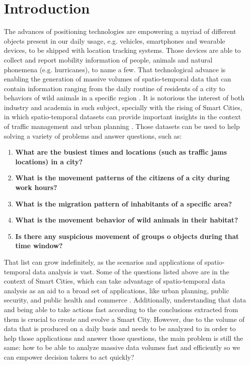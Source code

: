 \chapter{Introduction}
\label{chp:introduction}
The advances of positioning technologies are empowering a myriad of different objects present in our daily usage, e.g.
vehicles, smartphones and wearable devices, to be shipped with location tracking systems. Those devices are able to
collect and report mobility information of people, animals and natural phonemena (e.g. hurricanes), to name a few. That
technological advance is enabling the generation of massive volumes of spatio-temporal data that can contain information
ranging from the daily routine of residents of a city \citep{whatdidyoudo} to behaviors of wild animals in a specific
region \citep{trajclustering}\citep{miningperiodic}. It is notorious the interest of both industry and academia in such subject,
%
%
%
specially with the rising of Smart Cities, in which spatio-temporal datasets can provide important insights in the
context of traffic management and urban planning \citep{gissmartcities}\citep{parallelsmartcities}. Those datasets can
be used to help solving a variety of problems and answer questions, such as:

\begin{enumerate}
    \item \textbf{What are the busiest times and locations (such as traffic jams locations) in a city?}
        \citep{visualtrafficjam}
    \item \textbf{What is the movement patterns of the citizens of a city during work hours?}
    \item \textbf{What is the migration pattern of inhabitants of a specific area?}
    \item \textbf{What is the movement behavior of wild animals in their habitat?} \citep{movemine}
    \item \textbf{Is there any suspicious movement of groups o objects during that time window?}
\end{enumerate}

That list can grow indefinitely, as the scenarios and applications of spatio-temporal data analysis is vast. Some of the
questions listed above are in the context of Smart Cities, which can take advantage of spatio-temporal data analysis as
an aid to a broad set of applications, like urban planning, public security, and public health and commerce
\citep{ieeesmartcities}. Additionally, understanding that data and being able to take actions fast according to the
conclusions extracted from them is crucial to create and evolve a Smart City. However, due to the volume of data that is
produced on a daily basis and needs to be analyzed to in order to help those applications and answer those questions,
the main problem is still the same: how to be able to analyze massive data volumes fast and efficiently so we can
empower decision takers to act quickly?

